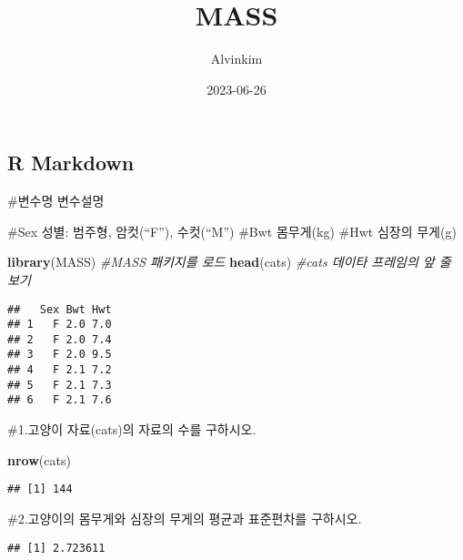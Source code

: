 \documentclass[
]{article}
\title{MASS}
\author{Alvinkim}
\date{2023-06-26}
\newenvironment{Shaded}{\begin{snugshade}}{\end{snugshade}}
\newcommand{\CommentTok}[1]{\textcolor[rgb]{0.56,0.35,0.01}{\textit{#1}}}
\newcommand{\FunctionTok}[1]{\textcolor[rgb]{0.13,0.29,0.53}{\textbf{#1}}}
\newcommand{\NormalTok}[1]{#1}
\newcommand{\SpecialCharTok}[1]{\textcolor[rgb]{0.81,0.36,0.00}{\textbf{#1}}}
\begin{document}
\maketitle

\hypertarget{r-markdown}{%
\subsection{R Markdown}\label{r-markdown}}

\#변수명 변수설명

\#Sex 성별: 범주형, 암컷(``F''), 수컷(``M'') \#Bwt 몸무게(kg) \#Hwt
심장의 무게(g)

\begin{Shaded}
\begin{Highlighting}[]
\FunctionTok{library}\NormalTok{(MASS) }\CommentTok{\#MASS 패키지를 로드}
\FunctionTok{head}\NormalTok{(cats) }\CommentTok{\#cats 데이타 프레임의 앞 줄 보기}
\end{Highlighting}
\end{Shaded}

\begin{verbatim}
##   Sex Bwt Hwt
## 1   F 2.0 7.0
## 2   F 2.0 7.4
## 3   F 2.0 9.5
## 4   F 2.1 7.2
## 5   F 2.1 7.3
## 6   F 2.1 7.6
\end{verbatim}

\#1.고양이 자료(cats)의 자료의 수를 구하시오.

\begin{Shaded}
\begin{Highlighting}[]
\FunctionTok{nrow}\NormalTok{(cats)}
\end{Highlighting}
\end{Shaded}

\begin{verbatim}
## [1] 144
\end{verbatim}

\#2.고양이의 몸무게와 심장의 무게의 평균과 표준편차를 구하시오.

\begin{Shaded}
\end{Shaded}

\begin{verbatim}
## [1] 2.723611
\end{verbatim}

\begin{Shaded}
\end{Shaded}
\end{document}
